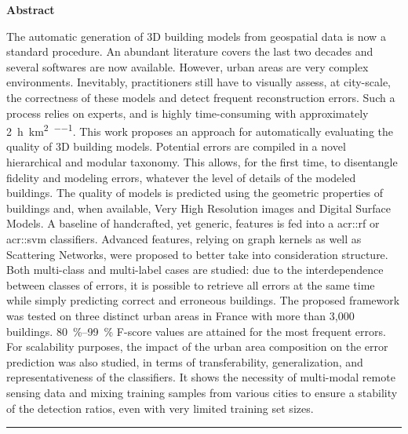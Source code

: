 \clearpage
\thispagestyle{empty}
\small

\begin{center}
    \textbf{Abstract}
\end{center}

The automatic generation of 3D building models from geospatial data is now a standard procedure.
An abundant literature covers the last two decades and several softwares are now available.
However, urban areas are very complex environments.
Inevitably, practitioners still have to visually assess, at city-scale, the correctness of these models and detect frequent reconstruction errors.
Such a process relies on experts, and is highly time-consuming with approximately \SI[per-mode=repeated-symbol]{2}{\hour\per\km\squared\per\expert}.
This work proposes an approach for automatically evaluating the quality of 3D building models.
Potential errors are compiled in a novel hierarchical and modular taxonomy.
This allows, for the first time, to disentangle fidelity and modeling errors, whatever the level of details of the modeled buildings.
The quality of models is predicted using the geometric properties of buildings and, when available, Very High Resolution images and Digital Surface Models.
A baseline of handcrafted, yet generic, features is fed into a \acrlong*{acr::rf} or \acrlong*{acr::svm} classifiers.
Advanced features, relying on graph kernels as well as Scattering Networks, were proposed to better take into consideration structure.
Both multi-class and multi-label cases are studied: due to the interdependence between classes of errors, it is possible to retrieve all errors at the same time while simply predicting correct and erroneous buildings.
The proposed framework was tested on three distinct urban areas in France with more than 3,000 buildings.
\SIrange{80}{99}{\percent} F-score values are attained for the most frequent errors.
For scalability purposes, the impact of the urban area composition on the error prediction was also studied, in terms of transferability, generalization, and representativeness of the classifiers.
It shows the necessity of multi-modal remote sensing data and mixing training samples from various cities to ensure a stability of the detection ratios, even with very limited training set sizes.

\begin{center}
    \rule{.3\textwidth}{1pt}
\end{center}

